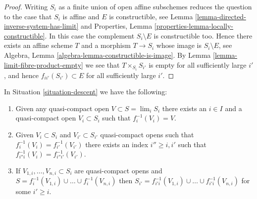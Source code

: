 \begin{proof}
Writing $S_i$ as a finite union of open affine subschemes reduces
the question to the case that $S_i$ is affine and $E$ is constructible, see
Lemma \ref{lemma-directed-inverse-system-has-limit}
and
Properties, Lemma \ref{properties-lemma-locally-constructible}.
In this case the complement $S_i \setminus E$ is constructible too.
Hence there exists an affine scheme $T$ and a morphism $T \to S_i$
whose image is $S_i \setminus E$, see
Algebra, Lemma \ref{algebra-lemma-constructible-is-image}.
By
Lemma \ref{lemma-limit-fibre-product-empty}
we see that $T \times_{S_i} S_{i'}$ is empty for all sufficiently large
$i'$, and hence $f_{ii'}(S_{i'}) \subset E$ for all sufficiently large $i'$.
\end{proof}

\begin{lemma}
\label{lemma-descend-opens}
In Situation \ref{situation-descent} we have the following:
\begin{enumerate}
\item Given any quasi-compact open $V \subset S = \lim_i S_i$
there exists an $i \in I$ and a quasi-compact open $V_i \subset S_i$
such that $f_i^{-1}(V_i) = V$.
\item Given $V_i \subset S_i$ and $V_{i'} \subset S_{i'}$
quasi-compact opens such that $f_i^{-1}(V_i) = f_{i'}^{-1}(V_{i'})$
there exists an index $i'' \geq i, i'$ such that
$f_{i''i}^{-1}(V_i) = f_{i''i'}^{-1}(V_{i'})$.
\item If $V_{1, i}, \ldots, V_{n, i} \subset S_i$ are quasi-compact
opens and $S = f_i^{-1}(V_{1, i}) \cup \ldots \cup f_i^{-1}(V_{n, i})$
then $S_{i'} = f_{i'i}^{-1}(V_{1, i}) \cup \ldots \cup f_{i'i}^{-1}(V_{n, i})$
for some $i' \geq i$.
\end{enumerate}
\end{lemma}

